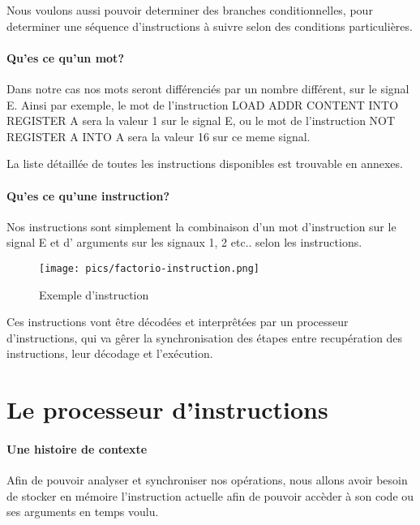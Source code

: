 Nous voulons aussi pouvoir determiner des branches conditionnelles, pour determiner une séquence d'instructions à suivre selon des conditions particulières.

\paragraph{Qu'es ce qu'un mot?}
Dans notre cas nos mots seront différenciés par un nombre différent, sur le signal E.
Ainsi par exemple, le mot de l'instruction LOAD ADDR CONTENT INTO REGISTER A sera la valeur 1 sur le signal E, ou le mot de  l'instruction NOT REGISTER A INTO A sera la valeur 16 sur ce meme signal.

\begin{info}
La liste détaillée de toutes les instructions disponibles est trouvable en annexes.
\end{info}

\paragraph{Qu'es ce qu'une instruction?}
Nos instructions sont simplement la combinaison d'un mot d'instruction sur le signal E et d' arguments sur les signaux 1, 2 etc.. selon les instructions.

\begin{figure}[h]
\centering
\texttt{[image: pics/factorio-instruction.png]}

\caption{Exemple d'instruction}
\end{figure}



Ces instructions vont être décodées et interprêtées par un processeur d'instructions, qui va gêrer la synchronisation des étapes entre recupération des instructions, leur décodage et l'exécution. 

\section{Le processeur d'instructions}



\paragraph{Une histoire de contexte}
Afin de pouvoir analyser et synchroniser nos opérations, nous allons avoir besoin de stocker en mémoire l'instruction actuelle afin de pouvoir accèder à son code ou ses arguments en temps voulu.

